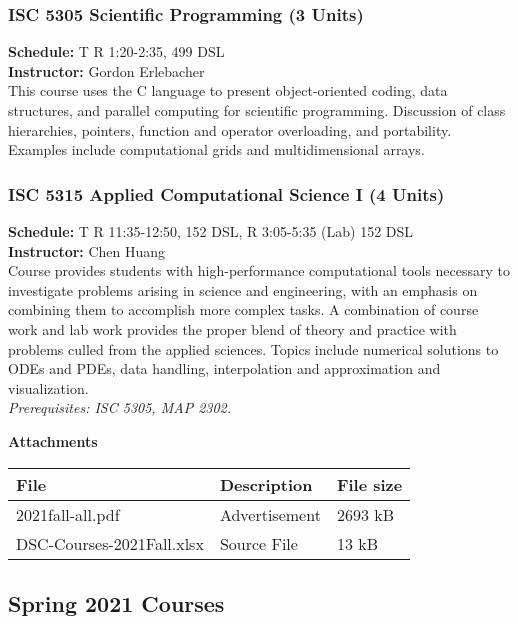 \documentclass[12pt,a4paper]{article}
\begin{document}
\subsubsection*{ISC 5305 Scientific Programming (3 Units)}
\textbf{Schedule:} T R 1:20-2:35, 499 DSL \\
\textbf{Instructor:} Gordon Erlebacher \\
This course uses the C language to present object-oriented coding, data structures, and parallel computing for scientific programming. Discussion of class hierarchies, pointers, function and operator overloading, and portability. Examples include computational grids and multidimensional arrays.

\subsubsection*{ISC 5315 Applied Computational Science I (4 Units)}
\textbf{Schedule:} T R 11:35-12:50, 152 DSL, R 3:05-5:35 (Lab) 152 DSL \\
\textbf{Instructor:} Chen Huang \\
Course provides students with high-performance computational tools necessary to investigate problems arising in science and engineering, with an emphasis on combining them to accomplish more complex tasks. A combination of course work and lab work provides the proper blend of theory and practice with problems culled from the applied sciences. Topics include numerical solutions to ODEs and PDEs, data handling, interpolation and approximation and visualization. \\
\textit{Prerequisites: ISC 5305, MAP 2302.}

\begin{center}
\textbf{Attachments}
\begin{tabular}{l l l}
\hline
\textbf{File} & \textbf{Description} & \textbf{File size} \\ \hline
2021fall-all.pdf & Advertisement & 2693 kB \\
DSC-Courses-2021Fall.xlsx & Source File & 13 kB \\ \hline
\end{tabular}
\end{center}
\newpage

\subsection{Spring 2021 Courses}
\end{document}
